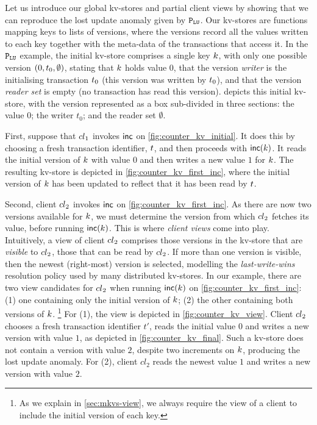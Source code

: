 Let us introduce  our global kv-stores and partial client views by
showing that we can reproduce the lost update anomaly given by 
\(\mathtt{P}_{\mathtt{LU}}\).
Our kv-stores are functions mapping keys to lists of versions, where
the versions  record all the values written to each key together with the
meta-data of the transactions that access it. 
In the \(\mathtt{P}_{\mathtt{LU}}\) example, the initial kv-store comprises a single key \(k\), with only one possible 
version \((0, t_{0}, \emptyset)\),  stating that \(k\) holds value \(0\), 
that the version \emph{writer} is the initialising transaction
\(t_0\) (this version was written by \(t_0\)), 
and that the version \emph{reader set} is empty (no transaction has read this version). 
 depicts this initial kv-store, with the version
represented as a box sub-divided in three sections: the value \(0\);
the writer \(t_0\); and the reader set \(\emptyset\). 


First, suppose that \({cl}_1\)  invokes \(\mathsf{inc}\) on
\cref{fig:counter_kv_initial}. It does this by choosing a fresh
transaction identifier, \(t\), 
and then proceeds with \(\mathsf{inc}(k)\). It reads the initial version
of \(k\) with value \(0\) 
and then writes a new value \(1\) for \(k\). 
The resulting kv-store is depicted in \cref{fig:counter_kv_first_inc},
where  the initial version of \(k\)  has been  updated to reflect that it
has been read by \(t\). 

Second, client \({cl}_2\) invokes \(\mathsf{inc}\) on
\cref{fig:counter_kv_first_inc}.  As there are now two versions
available for \(k\), we must determine the version from which
\({cl}_2\) fetches its value, before running \(\mathsf{inc}(k)\).  This is
where \emph{client views} come into play.  Intuitively, a view of
client \({cl}_2\) comprises those versions in the kv-store that are
\emph{visible} to \({cl}_2\), \ie those that can be read by
\({cl}_2\).  If more than one version is visible, then the newest
(right-most) version is selected, modelling the \emph{last-write-wins}
resolution policy used by many distributed kv-stores.
In our example, there are two view candidates for \({cl}_2\) when running
\(\mathsf{inc}(k)\) on \cref{fig:counter_kv_first_inc}: (1) one containing
only the initial version of \(k\); (2) the other containing both
versions of \(k\).%
\footnote{ As we explain in \cref{sec:mkvs-view}, we always require
  the view of a client to include the initial version of each key.}  
For (1), the view is depicted in
\cref{fig:counter_kv_view}.  Client \({cl}_2\) chooses a fresh
transaction identifier \(t'\), reads the initial value \(0\) and writes a
new version with value \(1\), as depicted in
\cref{fig:counter_kv_final}.  Such a kv-store does not contain a
version with value \(2\), despite two increments on \(k\), producing
the lost update anomaly.  For (2), client \(cl_2\) reads the newest
value \(1\) and writes a new version with value \(2\).

